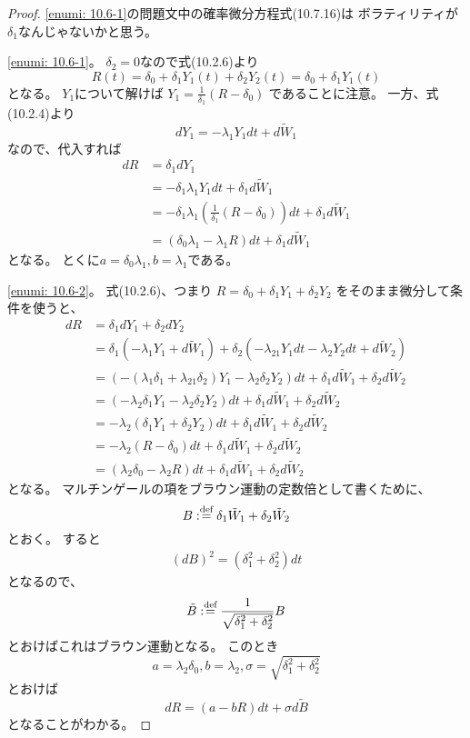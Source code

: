 \documentclass[uplatex]{jsarticle}
\theoremstyle{definition}
\def\dfn{:\overset{\mbox{{\scriptsize def}}}{=}}
\begin{document}
\begin{proof}
  \ref{enumi: 10.6-1}の問題文中の確率微分方程式(10.7.16)は
  ボラティリティが\(\delta_1\)なんじゃないかと思う。

  \ref{enumi: 10.6-1}。
  \(\delta_2=0\)なので式(10.2.6)より
  \[
  R(t) = \delta_0 + \delta_1Y_1(t) + \delta_2Y_2(t)
  = \delta_0 + \delta_1Y_1(t)
  \]
  となる。
  \(Y_1\)について解けば
  \(Y_1 = \frac{1}{\delta_1}(R-\delta_0)\)
  であることに注意。
  一方、式(10.2.4)より
  \[
  dY_1 = - \lambda_1Y_1dt + d\tilde{W}_1
  \]
  なので、代入すれば
  \begin{align*}
    dR &= \delta_1dY_1 \\
    &= - \delta_1\lambda_1Y_1dt + \delta_1d\tilde{W}_1 \\
    &= - \delta_1\lambda_1\left( \frac{1}{\delta_1}(R-\delta_0)\right)dt
    + \delta_1d\tilde{W}_1 \\
    &= \left( \delta_0\lambda_1 - \lambda_1R\right)dt
    + \delta_1d\tilde{W}_1
  \end{align*}
  となる。
  とくに\(a = \delta_0\lambda_1, b = \lambda_1\)である。

  \ref{enumi: 10.6-2}。
  式(10.2.6)、つまり
  \(R = \delta_0 + \delta_1Y_1 + \delta_2Y_2\)
  をそのまま微分して条件を使うと、
  \begin{align*}
    dR &= \delta_1dY_1 + \delta_2dY_2 \\
    &= \delta_1\left( - \lambda_1 Y_1 + d\tilde{W}_1 \right)
    + \delta_2\left( -\lambda_{21}Y_1dt - \lambda_2Y_2dt + d\tilde{W}_2\right) \\
    &= \left( - (\lambda_1\delta_1 + \lambda_{21}\delta_2) Y_1
    - \lambda_2\delta_2Y_2 \right) dt
    + \delta_1d\tilde{W}_1 + \delta_2d\tilde{W}_2 \\
    &= \left( - \lambda_2\delta_1 Y_1 - \lambda_2\delta_2 Y_2 \right) dt
    + \delta_1d\tilde{W}_1 + \delta_2d\tilde{W}_2 \\
    &= - \lambda_2 \left( \delta_1 Y_1 + \delta_2 Y_2 \right) dt
    + \delta_1d\tilde{W}_1 + \delta_2d\tilde{W}_2 \\
    &= - \lambda_2 \left( R - \delta_0 \right) dt
    + \delta_1d\tilde{W}_1 + \delta_2d\tilde{W}_2 \\
    &= ( \lambda_2\delta_0 - \lambda_2 R ) dt
    + \delta_1d\tilde{W}_1 + \delta_2d\tilde{W}_2
  \end{align*}
  となる。
  マルチンゲールの項をブラウン運動の定数倍として書くために、
  \[B \dfn \delta_1\tilde{W}_1 + \delta_2\tilde{W}_2\]
  とおく。
  すると
  \begin{align*}
    (dB)^2 = (\delta_1^2 + \delta_2^2)dt
  \end{align*}
  となるので、
  \[
  \tilde{B} \dfn \frac{1}{\sqrt{\delta_1^2+\delta_2^2}}B
  \]
  とおけばこれはブラウン運動となる。
  このとき
  \[a=\lambda_2\delta_0, b=\lambda_2, \sigma=\sqrt{\delta_1^2+\delta_2^2}\]
  とおけば
  \[
  dR = (a-bR)dt + \sigma d\tilde{B}
  \]
  となることがわかる。
\end{proof}
\end{document}
